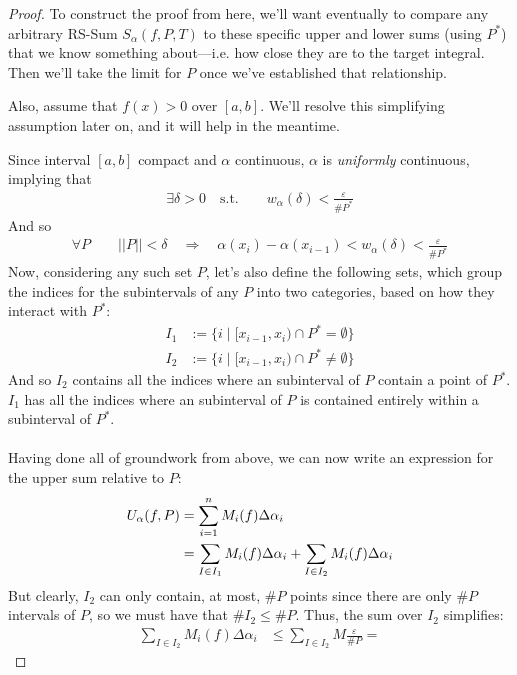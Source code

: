 \documentclass[12pt]{article}
\numberwithin{equation}{section} %
\theoremstyle{plain}
\theoremstyle{definition}
\theoremstyle{remark}
\begin{document}
\begin{proof}
To construct the proof from here, we'll want eventually to compare any
arbitrary RS-Sum $S_\alpha(f,P,T)$ to these specific upper and lower
sums (using $P^*$) that we know something about---i.e. how close they
are to the target integral. Then we'll take the limit for $P$ once we've
established that relationship.

Also, assume that $f(x)>0$ over $[a,b]$. We'll resolve this simplifying
assumption later on, and it will help in the meantime.

Since interval $[a,b]$ compact and $\alpha$ continuous, $\alpha$ is
\emph{uniformly} continuous, implying that
\begin{align*}
  \exists \delta > 0 \quad \text{s.t.} \qquad
  w_\alpha(\delta) < \frac{\varepsilon}{\#P^*}
\end{align*}
And so
\begin{align*}
  \forall P \qquad ||P||<\delta \quad \Rightarrow
      \quad \alpha(x_i) - \alpha(x_{i-1}) < w_\alpha(\delta)
      <  \frac{\varepsilon}{\#P^*}
\end{align*}
Now, considering any such set $P$, let's also define the following sets,
which group the indices for the subintervals of any $P$ into two
categories, based on how they interact with $P^*$:
\begin{align*}
    I_1 &:= \{i \; | \; [x_{i-1},x_i) \cap P^* = \emptyset \}\\
    I_2 &:= \{i \; | \; [x_{i-1},x_i) \cap P^* \neq \emptyset \}
\end{align*}
And so $I_2$ contains all the indices where an subinterval of $P$
contain a point of $P^*$. $I_1$ has all the indices where an subinterval
of $P$ is contained entirely within a subinterval of $P^*$.
\\
\\
Having done all of groundwork from above, we can now write an expression
for the upper sum relative to $P$:
\begin{align}
    U_\alpha(f,P) &= \sum^n_{i=1} M_i(f) \Delta\alpha_i \notag \\
        &= \sum_{I\in I_1} M_i(f) \Delta\alpha_i
         + \sum_{I\in I_2} M_i(f) \Delta\alpha_i
         \label{twosums}
\end{align}
But clearly, $I_2$ can only contain, at most, $\#P$ points since there
are only $\#P$ intervals of $P$, so we must have that $\#I_2 \leq \#P$.
Thus, the sum over $I_2$ simplifies:
\begin{align}
        \sum_{I\in I_2} M_i(f) \Delta\alpha_i
        &\leq \sum_{I\in I_2} M \frac{\varepsilon}{\#P} =

\end{align}
\end{proof}
\end{document}

